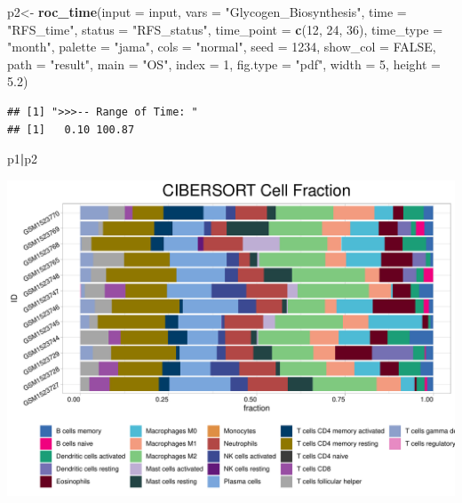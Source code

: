 \documentclass[
  12pt,
]{book}
\newenvironment{Shaded}{\begin{snugshade}}{\end{snugshade}}
\newcommand{\AttributeTok}[1]{\textcolor[rgb]{0.13,0.29,0.53}{#1}}
\newcommand{\ConstantTok}[1]{\textcolor[rgb]{0.56,0.35,0.01}{#1}}
\newcommand{\DecValTok}[1]{\textcolor[rgb]{0.00,0.00,0.81}{#1}}
\newcommand{\FloatTok}[1]{\textcolor[rgb]{0.00,0.00,0.81}{#1}}
\newcommand{\FunctionTok}[1]{\textcolor[rgb]{0.13,0.29,0.53}{\textbf{#1}}}
\newcommand{\NormalTok}[1]{#1}
\newcommand{\OtherTok}[1]{\textcolor[rgb]{0.56,0.35,0.01}{#1}}
\newcommand{\SpecialCharTok}[1]{\textcolor[rgb]{0.81,0.36,0.00}{\textbf{#1}}}
\newcommand{\StringTok}[1]{\textcolor[rgb]{0.31,0.60,0.02}{#1}}
\theoremstyle{definition}
\theoremstyle{definition}
\theoremstyle{definition}
\theoremstyle{definition}
\theoremstyle{remark}
\begin{document}
\begin{Shaded}
\begin{Highlighting}[]
\NormalTok{p2}\OtherTok{\textless{}{-}} \FunctionTok{roc\_time}\NormalTok{(}\AttributeTok{input      =}\NormalTok{ input,  }
             \AttributeTok{vars       =} \StringTok{"Glycogen\_Biosynthesis"}\NormalTok{, }
             \AttributeTok{time       =} \StringTok{"RFS\_time"}\NormalTok{,}
             \AttributeTok{status     =} \StringTok{"RFS\_status"}\NormalTok{, }
             \AttributeTok{time\_point =} \FunctionTok{c}\NormalTok{(}\DecValTok{12}\NormalTok{, }\DecValTok{24}\NormalTok{, }\DecValTok{36}\NormalTok{), }
             \AttributeTok{time\_type  =} \StringTok{"month"}\NormalTok{,}
             \AttributeTok{palette    =} \StringTok{"jama"}\NormalTok{,}
             \AttributeTok{cols       =} \StringTok{"normal"}\NormalTok{,}
             \AttributeTok{seed       =} \DecValTok{1234}\NormalTok{, }
             \AttributeTok{show\_col   =} \ConstantTok{FALSE}\NormalTok{, }
             \AttributeTok{path       =} \StringTok{"result"}\NormalTok{, }
             \AttributeTok{main       =} \StringTok{"OS"}\NormalTok{,}
             \AttributeTok{index      =} \DecValTok{1}\NormalTok{,}
             \AttributeTok{fig.type   =} \StringTok{"pdf"}\NormalTok{,}
             \AttributeTok{width      =} \DecValTok{5}\NormalTok{,}
             \AttributeTok{height     =} \FloatTok{5.2}\NormalTok{)}
\end{Highlighting}
\end{Shaded}

\begin{verbatim}
## [1] ">>>-- Range of Time: "
## [1]   0.10 100.87
\end{verbatim}

\begin{Shaded}
\begin{Highlighting}[]
\NormalTok{p1}\SpecialCharTok{|}\NormalTok{p2}
\end{Highlighting}
\end{Shaded}

\includegraphics{_main_files/figure-latex/unnamed-chunk-50-1.pdf}
\end{document}
